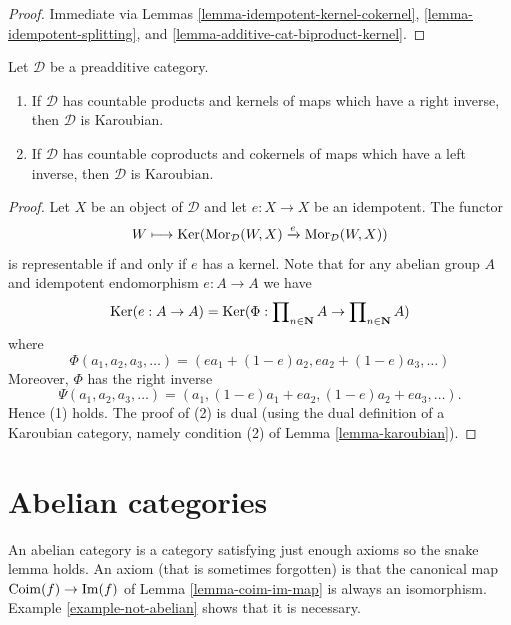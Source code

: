\begin{proof}
Immediate via Lemmas \ref{lemma-idempotent-kernel-cokernel},
\ref{lemma-idempotent-splitting}, and \ref{lemma-additive-cat-biproduct-kernel}.
\end{proof}

\begin{lemma}
\label{lemma-projectors-have-images}
Let $\mathcal{D}$ be a preadditive category.
\begin{enumerate}
\item If $\mathcal{D}$ has countable products and kernels of maps which
have a right inverse, then $\mathcal{D}$ is Karoubian.
\item If $\mathcal{D}$ has countable coproducts and cokernels of
maps which have a left inverse, then $\mathcal{D}$ is Karoubian.
\end{enumerate}
\end{lemma}

\begin{proof}
Let $X$ be an object of $\mathcal{D}$ and let $e : X \to X$ be an idempotent.
The functor
$$
W \longmapsto \mathop{\mathrm{Ker}}(
\mathop{\mathrm{Mor}}\nolimits_\mathcal{D}(W, X)
\xrightarrow{e}
\mathop{\mathrm{Mor}}\nolimits_\mathcal{D}(W, X)
)
$$
is representable if and only if $e$ has a kernel. Note that for any
abelian group $A$ and idempotent endomorphism $e : A \to A$ we have
$$
\mathop{\mathrm{Ker}}(e : A \to A)
= \mathop{\mathrm{Ker}}(\Phi :
\prod\nolimits_{n \in \mathbf{N}} A
\to
\prod\nolimits_{n \in \mathbf{N}} A
)
$$
where
$$
\Phi(a_1, a_2, a_3, \ldots) = (ea_1 + (1 - e)a_2, ea_2 + (1 - e)a_3, \ldots)
$$
Moreover, $\Phi$ has the right inverse
$$
\Psi(a_1, a_2, a_3, \ldots) =
(a_1, (1 - e)a_1 + ea_2, (1 - e)a_2 + ea_3, \ldots).
$$
Hence (1) holds. The proof of (2) is dual (using the dual definition
of a Karoubian category, namely condition (2) of
Lemma \ref{lemma-karoubian}).
\end{proof}









\section{Abelian categories}
\label{section-abelian-categories}

\noindent
An abelian category is a category satisfying just enough axioms so the
snake lemma holds. An axiom (that is sometimes forgotten)
is that the canonical map $\mathop{\mathrm{Coim}}(f) \to \mathop{\mathrm{Im}}(f)$
of Lemma \ref{lemma-coim-im-map} is always an isomorphism.
Example \ref{example-not-abelian} shows that it is necessary.

